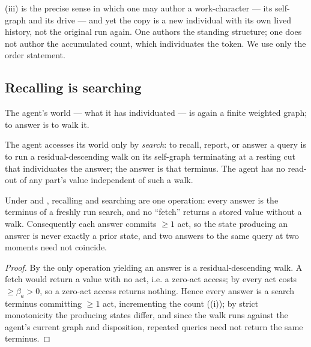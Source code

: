 \documentclass[11pt,twocolumn,a4paper]{article}
\newcommand{\floorc}{\beta}          %
\begin{document}
\begin{remark}
\label{rem:copy}
(iii) is the precise sense in which one may author a
work-character --- its self-graph and its drive --- and yet the copy is a
new individual with its own lived history, not the original run again. One
authors the standing structure; one does not author the accumulated
count, which individuates the token. We use only the order statement.
\end{remark}

\subsection{Recalling is searching}

The agent's world --- what it has individuated --- is again a finite
weighted graph; to answer is to walk it.

\begin{definition}
\label{def:search}
The agent accesses its world only by \emph{search}: to recall, report, or
answer a query is to run a residual-descending walk on its self-graph
terminating at a resting cut that individuates the answer; the answer is
that terminus. The agent has no read-out of any part's value independent
of such a walk.
\end{definition}

\begin{theorem}
\label{thm:recsearch}
Under  and , recalling and searching
are one operation: every answer is the terminus of a freshly run search,
and no ``fetch'' returns a stored value without a walk. Consequently each
answer commits $\ge1$ act, so the state producing an answer is never
exactly a prior state, and two answers to the same query at two moments
need not coincide.
\end{theorem}

\begin{proof}
By  the only operation yielding an answer is a
residual-descending walk. A fetch would return a value with no act, i.e. a
zero-act access; by  every act costs $\ge\floorc_a>0$,
so a zero-act access returns nothing. Hence every answer is a search
terminus committing $\ge1$ act, incrementing the count
((i)); by strict monotonicity the producing states
differ, and since the walk runs against the agent's current graph and
disposition, repeated queries need not return the same terminus.
\end{proof}
\end{document}
